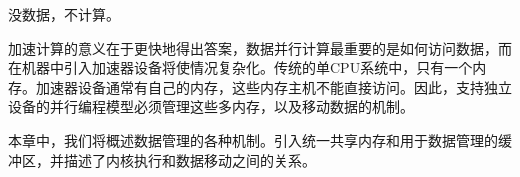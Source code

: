 没数据，不计算。\par

加速计算的意义在于更快地得出答案，数据并行计算最重要的是如何访问数据，而在机器中引入加速器设备将使情况复杂化。传统的单CPU系统中，只有一个内存。加速器设备通常有自己的内存，这些内存主机不能直接访问。因此，支持独立设备的并行编程模型必须管理这些多内存，以及移动数据的机制。\par

本章中，我们将概述数据管理的各种机制。引入统一共享内存和用于数据管理的缓冲区，并描述了内核执行和数据移动之间的关系。\par












